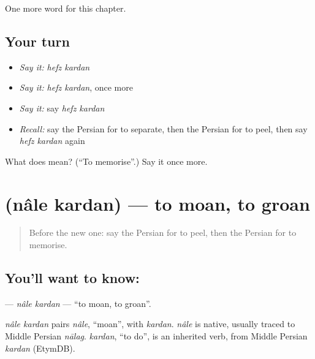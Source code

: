 \begin{grammarlens}[title={What you've built}]
One more word for this chapter.
\end{grammarlens}

\subsection*{Your turn}
\begin{itemize}
\raggedright
  \item \emph{Say it:} \emph{hefz kardan}
  \item \emph{Say it:} \emph{hefz kardan}, once more
  \item \emph{Say it:} say \emph{hefz kardan}
  \item \emph{Recall:} say the Persian for to separate, then the Persian for to peel, then say \emph{hefz kardan} again
\end{itemize}

\begin{tcolorbox}[breakable,colback=teal!4,colframe=teal!35!black,title={Before you move on}]
What does   mean? (\textquotedblleft{}To memorise\textquotedblright{}.) Say it once more.
\end{tcolorbox}
\section[\texorpdfstring{\fa{ناله} \fa{کردن} (nâle kardan)}{ناله کردن (nâle kardan)}]{  (nâle kardan) — to moan, to groan}

\label{lesson:FA-C225-nale-kardan}



\begin{quote}
Before the new one: say the Persian for to peel, then the Persian for to memorise.
\end{quote}

\subsection*{You'll want to know:  }
\textbf{ } — \emph{nâle kardan} — \textquotedblleft{}to moan, to groan\textquotedblright{}.

\begin{cousinweb}
\emph{nâle kardan} pairs \emph{nâle}, \textquotedblleft{}moan\textquotedblright{}, with \emph{kardan}. \emph{nâle} is native, usually traced to Middle Persian \emph{nālag}. \emph{kardan}, \textquotedblleft{}to do\textquotedblright{}, is an inherited verb, from Middle Persian \emph{kardan} (EtymDB).
\end{cousinweb}

